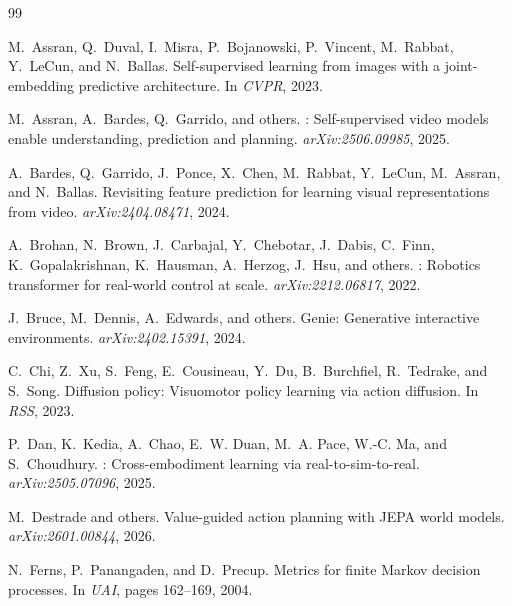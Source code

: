 \documentclass[10pt,twocolumn]{article}
\theoremstyle{tightstyle}
\begin{document}

\begin{thebibliography}{99}

M.~Assran, Q.~Duval, I.~Misra, P.~Bojanowski, P.~Vincent, M.~Rabbat,
Y.~LeCun, and N.~Ballas.
\newblock Self-supervised learning from images with a joint-embedding predictive architecture.
\newblock In \emph{CVPR}, 2023.

M.~Assran, A.~Bardes, Q.~Garrido, and others.
: Self-supervised video models enable understanding,
prediction and planning.
\newblock \emph{arXiv:2506.09985}, 2025.

A.~Bardes, Q.~Garrido, J.~Ponce, X.~Chen, M.~Rabbat, Y.~LeCun,
M.~Assran, and N.~Ballas.
\newblock Revisiting feature prediction for learning visual representations from video.
\newblock \emph{arXiv:2404.08471}, 2024.

A.~Brohan, N.~Brown, J.~Carbajal, Y.~Chebotar, J.~Dabis, C.~Finn,
K.~Gopalakrishnan, K.~Hausman, A.~Herzog, J.~Hsu, and others.
: Robotics transformer for real-world control at scale.
\newblock \emph{arXiv:2212.06817}, 2022.

J.~Bruce, M.~Dennis, A.~Edwards, and others.
\newblock Genie: Generative interactive environments.
\newblock \emph{arXiv:2402.15391}, 2024.

C.~Chi, Z.~Xu, S.~Feng, E.~Cousineau, Y.~Du, B.~Burchfiel, R.~Tedrake,
and S.~Song.
\newblock Diffusion policy: Visuomotor policy learning via action diffusion.
\newblock In \emph{RSS}, 2023.

P.~Dan, K.~Kedia, A.~Chao, E.~W. Duan, M.~A. Pace, W.-C. Ma, and
S.~Choudhury.
: Cross-embodiment learning via real-to-sim-to-real.
\newblock \emph{arXiv:2505.07096}, 2025.

M.~Destrade and others.
\newblock Value-guided action planning with {JEPA} world models.
\newblock \emph{arXiv:2601.00844}, 2026.

N.~Ferns, P.~Panangaden, and D.~Precup.
\newblock Metrics for finite Markov decision processes.
\newblock In \emph{UAI}, pages 162--169, 2004.


\end{thebibliography}
\end{document}
